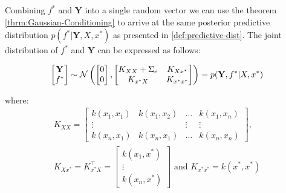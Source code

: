 
%


Combining $f^{\ast}$ and $\mathbf{Y}$ into a single random vector we can use the theorem \ref{thrm:Gaussian-Conditioning}
to arrive at the same posterior predictive distribution
$p(f^{\ast} | \mathbf{Y}, X, x^{\ast})$ as presented in \ref{def:predictive-dist}.
The joint distribution of $f^{\ast}$ and $\mathbf{Y}$ can be expressed as follows:

\begin{gather}
    \begin{bmatrix}
        \mathbf{Y} \\
        f^{\ast}
    \end{bmatrix}
    \sim \operatorname{\mathcal{N}} \left(
        \begin{bmatrix}
        0 \\
        0
        \end{bmatrix},
        \begin{bmatrix}
        K_{XX} + \Sigma_e & K_{Xx^{\ast}} \\
        K_{x^{\ast}X} & K_{x^{\ast}x^{\ast}}
        \end{bmatrix}
        \right)
    = p(\mathbf{Y}, f^{\ast}| X, x^{\ast})
\end{gather}

where:
\begin{gather*}
    K_{XX} =
    \begin{bmatrix}
        k(x_1, x_1) & k(x_1, x_2) & \dots & k(x_1, x_n)\\
        \vdots  &  & \vdots  & \vdots \\
        k(x_n, x_1)  & k(x_n, x_1) & \dots  & k(x_n, x_n)
    \end{bmatrix}, \\
    K_{Xx^{\ast}} = K_{x^{\ast}X}^{\top} =
    \begin{bmatrix}
        k(x_1, x^{\ast}) \\
        \vdots \\
        k(x_n,  x^{\ast})
    \end{bmatrix} \text{ and }
    K_{x^{\ast}x^{\ast}} = k(x^{\ast},x^{\ast})
\end{gather*}

